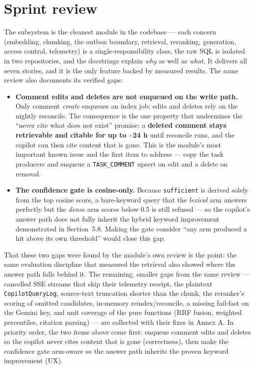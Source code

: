 \section{Sprint review}

The subsystem is the cleanest module in the codebase --- each concern (embedding, chunking, the outbox boundary,
retrieval, reranking, generation, access control, telemetry) is a single-responsibility class, the raw SQL is
isolated in two repositories, and the docstrings explain \emph{why} as well as \emph{what}. It delivers all seven
stories, and it is the only feature backed by measured results. The same review also documents its
verified gaps:

\begin{itemize}
  \item \textbf{Comment edits and deletes are not enqueued on the write path.} Only comment \emph{create} enqueues an index
  job; edits and deletes rely on the nightly reconcile. The consequence is the one property that undermines the
  ``never cite what does not exist'' promise: a \textbf{deleted comment stays retrievable and citable for up to \textasciitilde24 h}
  until reconcile runs, and the copilot can then cite content that is gone. This is the module's most
  important known issue and the first item to address --- copy the task producers and enqueue a
  \texttt{TASK\_COMMENT} upsert on edit and a delete on removal.
  \item \textbf{The confidence gate is cosine-only.} Because \texttt{sufficient} is derived solely from the top cosine score, a
  bare-keyword query that the \emph{lexical} arm answers perfectly but the \emph{dense} arm scores below 0.5 is still
  refused --- so the copilot's answer path does not fully inherit the hybrid keyword improvement demonstrated in Section~5.8. Making
  the gate consider ``any arm produced a hit above its own threshold'' would close this gap.
\end{itemize}

That these two gaps were found by the module's own review is the point: the same evaluation discipline that
measured the retrieval also showed where the answer path falls behind it. The remaining, smaller gaps from the same
review --- cancelled SSE streams that skip their telemetry receipt, the plaintext \texttt{CopilotQueryLog}, source-text
truncation shorter than the chunk, the reranker's scoring of omitted candidates, in-memory reindex/reconcile,
a missing fail-fast on the Gemini key, and unit coverage of the pure functions (RRF fusion,
weighted percentiles, citation parsing) --- are collected with their fixes in Annex A. In priority order, the
two items above come first: enqueue comment edits and deletes so the copilot never cites content that is gone
(correctness), then make the confidence gate arm-aware so the answer path inherits the proven keyword improvement (UX).


